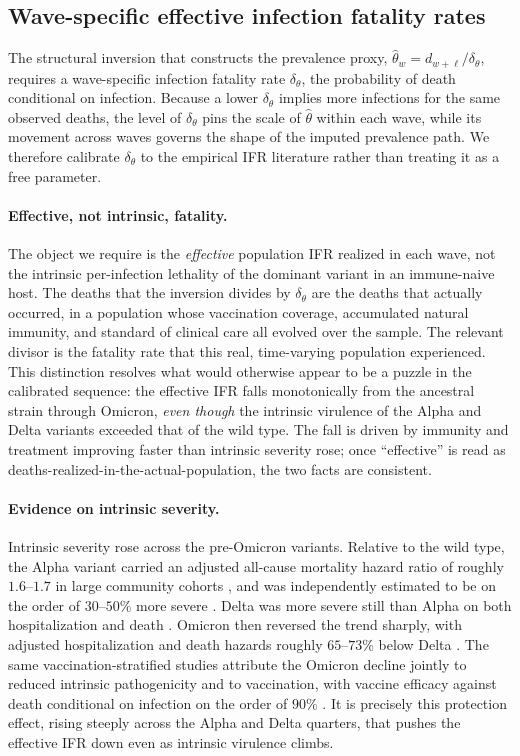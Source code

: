 \documentclass[12pt, a4paper]{article}
\begin{document}
\subsection{Wave-specific effective infection fatality rates}
\label{app:ifr}

The structural inversion that constructs the prevalence proxy,
$\hat{\theta}_w = d_{w+\ell}/\delta_\theta$, requires a wave-specific
infection fatality rate $\delta_\theta$, the probability of death conditional
on infection. Because a lower $\delta_\theta$ implies more infections for the
same observed deaths, the level of $\delta_\theta$ pins the scale of
$\hat{\theta}$ within each wave, while its movement across waves governs the
shape of the imputed prevalence path. We therefore calibrate $\delta_\theta$
to the empirical IFR literature rather than treating it as a free parameter.

\paragraph{Effective, not intrinsic, fatality.}
The object we require is the \emph{effective} population IFR realized in each
wave, not the intrinsic per-infection lethality of the dominant variant in an
immune-naive host. The deaths that the inversion divides by $\delta_\theta$
are the deaths that actually occurred, in a population whose vaccination
coverage, accumulated natural immunity, and standard of clinical care all
evolved over the sample. The relevant divisor is the fatality rate that this
real, time-varying population experienced. This distinction resolves what
would otherwise appear to be a puzzle in the calibrated sequence: the
effective IFR falls monotonically from the ancestral strain through Omicron,
\emph{even though} the intrinsic virulence of the Alpha and Delta variants
exceeded that of the wild type. The fall is driven by immunity and treatment
improving faster than intrinsic severity rose; once ``effective'' is read as
deaths-realized-in-the-actual-population, the two facts are consistent.

\paragraph{Evidence on intrinsic severity.}
Intrinsic severity rose across the pre-Omicron variants. Relative to the wild
type, the Alpha variant carried an adjusted all-cause mortality hazard ratio
of roughly $1.6$--$1.7$ in large community cohorts
\citep{challen2021,nyberg2022}, and was independently estimated to be on the
order of $30$--$50\%$ more severe \citep{davies2021severity}. Delta was more
severe still than Alpha on both hospitalization and death
\citep{marziano2023}. Omicron then reversed the trend sharply, with adjusted
hospitalization and death hazards roughly $65$--$73\%$ below Delta
\citep{veneti2022,sievers2022,wang2023}. The same vaccination-stratified
studies attribute the Omicron decline jointly to reduced intrinsic
pathogenicity and to vaccination, with vaccine efficacy against death
conditional on infection on the order of $90\%$ \citep{wang2023}. It is
precisely this protection effect, rising steeply across the Alpha and Delta
quarters, that pushes the effective IFR down even as intrinsic virulence
climbs.
\end{document}

